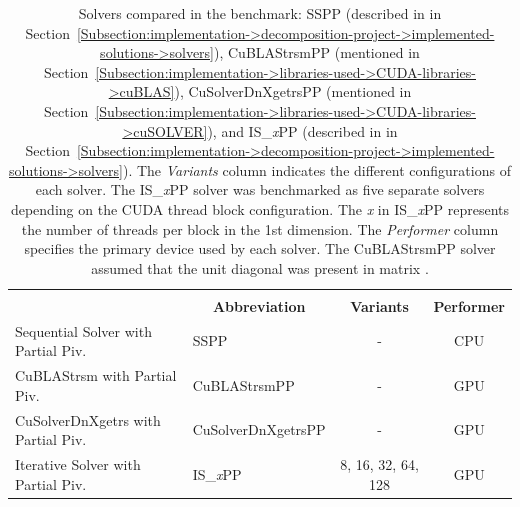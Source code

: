\begin{table}[ht!]
	\centering
	\begin{tabular}{|ll|c|c|}
		\hline
		\rowcolor[HTML]{C0C0C0} 
		\multicolumn{2}{|c|}{\cellcolor[HTML]{C0C0C0}\textbf{Solver}} & \cellcolor[HTML]{C0C0C0} & \multicolumn{1}{c|}{\cellcolor[HTML]{C0C0C0}} \\
		\rowcolor[HTML]{EFEFEF} 
		\multicolumn{1}{|c|}{\cellcolor[HTML]{EFEFEF}\textbf{Name}} & \multicolumn{1}{c|}{\cellcolor[HTML]{EFEFEF}\textbf{Abbreviation}} & \multirow{-2}{*}{\cellcolor[HTML]{C0C0C0}\textbf{Variants}} & \multicolumn{1}{c|}{\multirow{-2}{*}{\cellcolor[HTML]{C0C0C0}\textbf{Performer}}} \\ \hline
		\multicolumn{1}{|l|}{Sequential Solver with Partial Piv.} & SSPP               &         -          & CPU \\
		\multicolumn{1}{|l|}{CuBLAStrsm with Partial Piv.}        & CuBLAStrsmPP       &         -          & GPU \\
		\multicolumn{1}{|l|}{CuSolverDnXgetrs with Partial Piv.}  & CuSolverDnXgetrsPP &         -          & GPU \\
		\multicolumn{1}{|l|}{Iterative Solver with Partial Piv.}  & IS\_\textit{x}PP   & 8, 16, 32, 64, 128 & GPU \\ \hline
	\end{tabular}
	\caption{Solvers compared in the benchmark: SSPP (described in  in Section~\ref{Subsection:implementation->decomposition-project->implemented-solutions->solvers}), CuBLAStrsmPP (mentioned in Section~\ref{Subsection:implementation->libraries-used->CUDA-libraries->cuBLAS}), CuSolverDnXgetrsPP (mentioned in Section~\ref{Subsection:implementation->libraries-used->CUDA-libraries->cuSOLVER}), and IS\_\textit{x}PP (described in  in Section~\ref{Subsection:implementation->decomposition-project->implemented-solutions->solvers}).
		The \textit{Variants} column indicates the different configurations of each solver.
		The IS\_\textit{x}PP solver was benchmarked as five separate solvers depending on the CUDA thread block configuration.
		The \textit{x} in IS\_\textit{x}PP represents the number of threads per block in the 1st dimension.
		The \textit{Performer} column specifies the primary device used by each solver.
		The CuBLAStrsmPP solver assumed that the unit diagonal was present in matrix .
	}
	\label{Table:comparing-decomposers-and-solvers->decomposition-project-benchmarks->solvers-benchmark->table-of-solvers}
\end{table}

